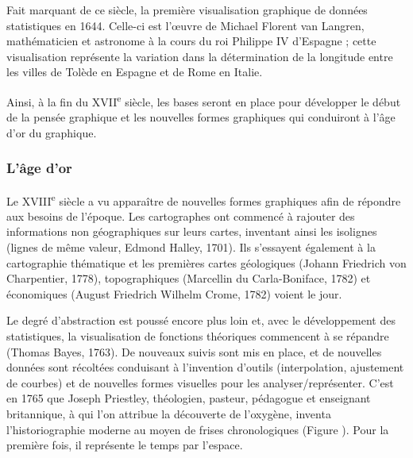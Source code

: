 \documentclass[]{article}
\begin{document}
Fait marquant de ce siècle, la première visualisation graphique de données statistiques en 1644. Celle-ci est l'\oe uvre de Michael Florent van Langren, mathématicien et astronome à la cours du roi Philippe IV d'Espagne ; cette visualisation représente la variation dans la détermination de la longitude entre les villes de Tolède en Espagne et de Rome en Italie.

Ainsi, à la fin du XVII\textsuperscript{e} siècle, les bases seront en place pour développer le début de la pensée graphique et les nouvelles formes graphiques qui conduiront à l'âge d'or du graphique.

\hypertarget{lage-dor}{%
\subsubsection{L'âge d'or}\label{lage-dor}}

Le XVIII\textsuperscript{e} siècle a vu apparaître de nouvelles formes graphiques afin de répondre aux besoins de l'époque. Les cartographes ont commencé à rajouter des informations non géographiques sur leurs cartes, inventant ainsi les isolignes (lignes de même valeur, Edmond Halley, 1701). Ils s'essayent également à la cartographie thématique et les premières cartes géologiques (Johann Friedrich von Charpentier, 1778), topographiques (Marcellin du Carla-Boniface, 1782) et économiques (August Friedrich Wilhelm Crome, 1782) voient le jour.

Le degré d'abstraction est poussé encore plus loin et, avec le développement des statistiques, la visualisation de fonctions théoriques commencent à se répandre (Thomas Bayes, 1763). De nouveaux suivis sont mis en place, et de nouvelles données sont récoltées conduisant à l'invention d'outils (interpolation, ajustement de courbes) et de nouvelles formes visuelles pour les analyser/représenter. C'est en 1765 que Joseph Priestley, théologien, pasteur, pédagogue et enseignant britannique, à qui l'on attribue la découverte de l'oxygène, inventa l'historiographie moderne au moyen de frises chronologiques (Figure \citet{fig:priestley}). Pour la première fois, il représente le temps par l'espace.
\end{document}
